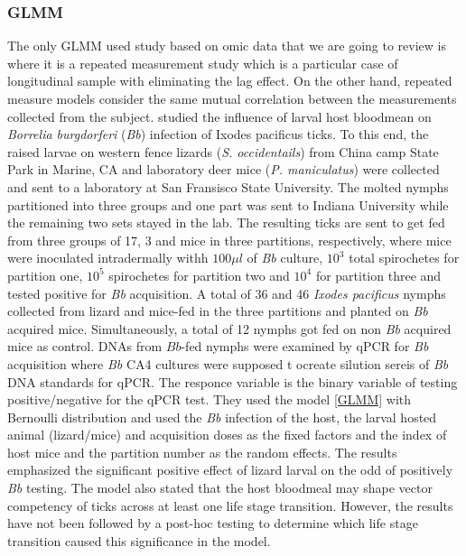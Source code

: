 \documentclass[]{article}
\begin{document}
		\subsubsection{GLMM}
		The only GLMM used study based on omic data that we are going to review is \cite{Ring2022} where it is a repeated measurement study which is a particular case of longitudinal sample with eliminating the lag effect. On the other hand, repeated measure models consider the same mutual correlation between the measurements collected from the subject. \cite{Ring2022} studied the influence of larval host bloodmean on \textit{Borrelia burgdorferi} (\textit{Bb}) infection of Ixodes pacificus ticks. To this end, the raised larvae on western fence lizards (\textit{S. occidentails}) from China camp State Park in Marine, CA and laboratory deer mice (\textit{P. maniculatus}) were collected and sent to a laboratory at San Fransisco State University. The molted nymphs partitioned into three groups and one part was sent to Indiana University while the remaining two sets stayed in the lab. The resulting ticks are sent to get fed from three groups of 17, 3 and mice in three partitions, respectively, where mice were inoculated intradermally withh $100\mu l$ of \textit{Bb} culture, $10^3$ total spirochetes for partition one, $10^5$ spirochetes for partition two and $10^4$ for partition three and tested positive for \textit{Bb} acquisition. A total of 36 and 46 \textit{Ixodes pacificus} nymphs collected from lizard and mice-fed in the three partitions and planted on \textit{Bb} acquired mice. Simultaneously, a total of 12 nymphs got fed on non \textit{Bb} acquired mice as control. DNAs from $Bb$-fed nymphs were examined by qPCR for \textit{Bb} acquisition where \textit{Bb} CA4 cultures were supposed t ocreate silution sereis of \textit{Bb} DNA standards for qPCR. The responce variable is the binary variable of testing positive/negative for the qPCR test. They used the model \eqref{GLMM} with Bernoulli distribution and used the \textit{Bb} infection of the host, the larval hosted animal (lizard/mice) and acquisition doses as the fixed factors and the index of host mice and the partition number as the random effects. The results emphasized the significant positive effect of lizard larval on the odd of positively \textit{Bb} testing. The model also stated that the host bloodmeal may shape vector competency of ticks across at least one life stage transition. However, the results have not been followed by a post-hoc testing to determine which life stage transition caused this significance in the model. 
		
\end{document}
